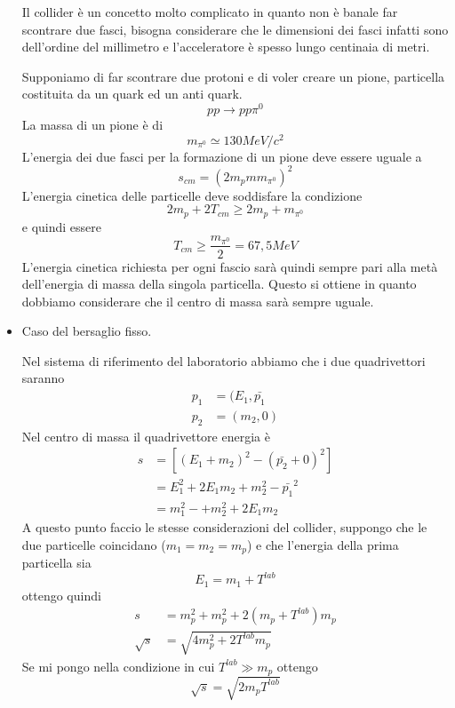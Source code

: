 \begin{itemize}
Il collider è un concetto molto complicato in quanto non è banale far scontrare due fasci, bisogna considerare che le dimensioni dei fasci infatti sono dell'ordine del millimetro e l'acceleratore è spesso lungo centinaia di metri.

Supponiamo di far scontrare due protoni e di voler creare un pione, particella costituita da un quark ed un anti quark.
\begin{equation}
pp\to pp\pi^0
\end{equation}
La massa di un pione è di 
\begin{equation}
m_{\pi^0}\simeq 130MeV/c^2
\end{equation}
L'energia dei due fasci per la formazione di un pione deve essere uguale a 
\begin{equation}
s_{cm}=(2m_pmm_{\pi^0})^2
\end{equation}
L'energia cinetica delle particelle deve soddisfare la condizione
\begin{equation}
2m_p+2T_{cm}\ge 2m_p+m_{\pi^0}
\end{equation}
e quindi essere
\begin{equation}
T_{cm}\ge \frac{m_{\pi^0}}{2}=67,5MeV
\end{equation}
L'energia cinetica richiesta per ogni fascio sarà quindi sempre pari alla metà dell'energia di massa della singola particella.
Questo si ottiene in quanto dobbiamo considerare che il centro di massa sarà sempre uguale.

\item Caso del bersaglio fisso.

Nel sistema di riferimento del laboratorio abbiamo che i due quadrivettori saranno 
\begin{equation}
\begin{split}
p_1&=(E_1,\bar{p_1}\\
p_2&=(m_2,0)
\end{split}
\end{equation}
Nel centro di massa il quadrivettore energia è 
\begin{equation}
\begin{split}
s&=[(E_1+m_2)^2-(\bar{p_2}+0)^2]\\
&=E_1^2+2E_1m_2+m_2^2-\bar{p_1}^2\\
&=m_1^2-+m_2^2+2E_1m_2
\end{split}
\end{equation}
A questo punto faccio le stesse considerazioni del collider, suppongo che le due particelle coincidano ($m_1=m_2=m_p$) e che l'energia della prima particella sia
\begin{equation}
E_1=m_1+T^{lab}
\end{equation}
ottengo quindi 
\begin{equation}
\begin{split}
s & =m_p^2 + m_p^2 + 2(m_p+T^{lab})m_p\\
\sqrt{s}&=\sqrt{4m_p^2+2T^{lab}m_p}
\end{split}
\end{equation}
Se mi pongo nella condizione in cui $T^{lab}\gg m_p$ ottengo
\begin{equation}
\sqrt{s}=\sqrt{2m_pT^{lab}}
\end{equation}


\end{itemize}
